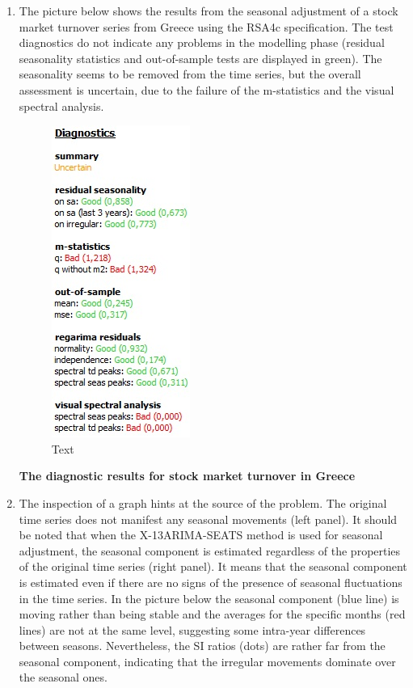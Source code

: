 \documentclass[
  letterpaper,
  DIV=11,
  numbers=noendperiod]{scrreprt}
\begin{document}
\begin{enumerate}
\def\labelenumi{\arabic{enumi}.}
\item
  The picture below shows the results from the seasonal adjustment of a
  stock market turnover series from Greece using the RSA4c
  specification. The test diagnostics do not indicate any problems in
  the modelling phase (residual seasonality statistics and out-of-sample
  tests are displayed in green). The seasonality seems to be removed
  from the time series, but the overall assessment is uncertain, due to
  the failure of the m-statistics and the visual spectral analysis.

  \begin{figure}

  {\centering \includegraphics{./All_images/UG_SA_image5.jpg}

  }

  \caption{Text}

  \end{figure}

  \textbf{The diagnostic results for stock market turnover in Greece}
\item
  The inspection of a graph hints at the source of the problem. The
  original time series does not manifest any seasonal movements (left
  panel). It should be noted that when the X-13ARIMA-SEATS method is
  used for seasonal adjustment, the seasonal component is estimated
  regardless of the properties of the original time series (right
  panel). It means that the seasonal component is estimated even if
  there are no signs of the presence of seasonal fluctuations in the
  time series. In the picture below the seasonal component (blue line)
  is moving rather than being stable and the averages for the specific
  months (red lines) are not at the same level, suggesting some
  intra-year differences between seasons. Nevertheless, the SI ratios
  (dots) are rather far from the seasonal component, indicating that the
  irregular movements dominate over the seasonal ones.


\end{enumerate}
\end{document}
